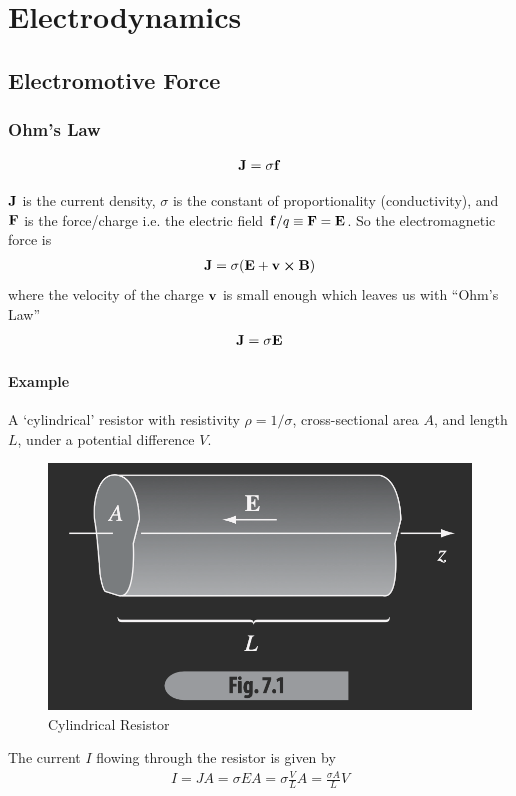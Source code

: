 \documentclass[../main.tex]{subfiles}
\begin{document}
\pagestyle{fancy}

\section{Electrodynamics}
\subsection{Electromotive Force}
\subsubsection{Ohm's Law}

\begin{align*}
    \vb J = \sigma \vb f
\end{align*}

$\vb J$ is the current density, $\sigma$ is the constant of proportionality (conductivity),
and $\vb F$ is the force/charge i.e. the electric field $\vb f / q \equiv \vb F = \vb E$.
So the electromagnetic force is 
\begin{align*}
    \vb J = \sigma(\vb E + \vb v \cross \vb B)
\end{align*}
where the velocity of the charge $\vb v$ is small enough which leaves us with ``Ohm's Law''
\begin{align*}
    \vb J = \sigma \vb E
\end{align*}

\paragraph{Example} A `cylindrical' resistor with resistivity $\rho = 1 / \sigma$,
cross-sectional area $A$, and length $L$, under a potential difference $V$.

\begin{figure}[ht]
    \centering
    \includegraphics[width=0.5\linewidth]{fig7_1.png}
    \caption{Cylindrical Resistor}
    \label{fig:gr7_1}
\end{figure}

The current $I$ flowing through the resistor is given by
\begin{align*}
    I = J A = \sigma E A = \sigma \frac{V}{L} A = \frac{\sigma A}{L} V
\end{align*}
\end{document}

